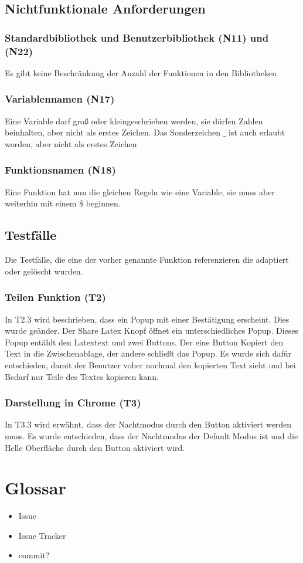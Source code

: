 \documentclass[parskip=full,11pt,twoside]{scrartcl}
\begin{document}
\subsection{Nichtfunktionale Anforderungen}

\subsubsection{Standardbibliothek und Benutzerbibliothek (N11) und (N22)}
	Es gibt keine Beschränkung der Anzahl der Funktionen in den Bibliotheken
\subsubsection{Variablennamen (N17)}
	Eine Variable darf groß oder kleingeschrieben werden, sie dürfen Zahlen
	beinhalten, aber nicht als erstes Zeichen.
	Das Sonderzeichen $\_ $ ist auch erlaubt worden, aber nicht als erstes Zeichen 
\subsubsection{Funktionsnamen (N18)}
	Eine Funktion hat nun die gleichen Regeln wie eine Variable, sie muss aber 
	weiterhin mit einem $\$$ beginnen.
	
\subsection{Testfälle}
	Die Testfälle, die eine der vorher genannte Funktion referenzieren die adaptiert oder
	gelöscht wurden.
\subsubsection{Teilen Funktion (T2)}
	In T2.3 wird beschrieben, dass ein Popup mit einer Bestätigung erscheint.
	Dies wurde geänder.
	Der Share Latex Knopf öffnet ein unterschiedliches Popup.
	Dieses Popup entählt den Latextext und zwei Buttons.
	Der eine Button Kopiert den Text in die Zwischenablage, der andere
	schließt das Popup.
	Es wurde sich dafür entschieden, damit der Benutzer voher nochmal den
	kopierten Text sieht und bei Bedarf nur Teile des Textes kopieren kann.
	
\subsubsection{Darstellung in Chrome (T3)}
	In T3.3 wird erwähnt, dass der Nachtmodus durch den Button aktiviert werden muss.
	Es wurde entschieden, dass der Nachtmodus der Default Modus ist und die Helle
	Oberfläche durch den Button aktiviert wird.
\section{Glossar}
\begin{itemize}
    \item Issue
    \item Issue Tracker
    \item commit?
\end{itemize}
\end{document}

